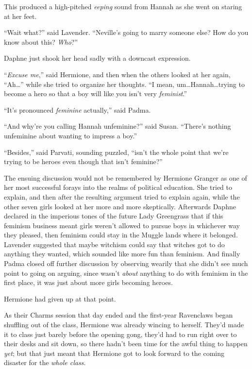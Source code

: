 This produced a high-pitched \emph{eeping} sound from Hannah as she went on staring at her feet.

“Wait what?” said Lavender. “Neville’s going to marry someone else? How do you know about this? \emph{Who}?”

Daphne just shook her head sadly with a downcast expression.

“\emph{Excuse me},” said Hermione, and then when the others looked at her again, “Ah…” while she tried to organize her thoughts. “I mean, um…Hannah…trying to become a hero so that a boy will like you isn’t very \emph{feminist}.”

“It’s pronounced \emph{feminine} actually,” said Padma.

“And why’re you calling Hannah unfeminine?” said Susan. “There’s nothing unfeminine about wanting to impress a boy.”

“Besides,” said Parvati, sounding puzzled, “isn’t the whole point that we’re trying to be heroes even though that isn’t feminine?”

The ensuing discussion would not be remembered by Hermione Granger as one of her most successful forays into the realms of political education. She tried to explain, and then after the resulting argument tried to explain again, while the other seven girls looked at her more and more skeptically. Afterwards Daphne declared in the imperious tones of the future Lady Greengrass that if this feminism business meant girls weren’t allowed to pursue boys in whichever way they pleased, then feminism could stay in the Muggle lands where it belonged. Lavender suggested that maybe witchism could say that witches got to do anything they wanted, which sounded like more fun than feminism. And finally Padma closed off further discussion by observing wearily that she didn’t see much point to going on arguing, since \SPHEW{} wasn’t \emph{about} anything to do with feminism in the first place, it was just about more girls becoming heroes.

Hermione had given up at that point.

\later

As their Charms session that day ended and the first-year Ravenclaws began shuffling out of the class, Hermione was already wincing to herself. They’d made it to class just barely before the opening gong, they’d had to run right over to their desks and sit down, so there hadn’t been time for the awful thing to happen \emph{yet}; but that just meant that Hermione got to look forward to the coming disaster for the \emph{whole class.}

